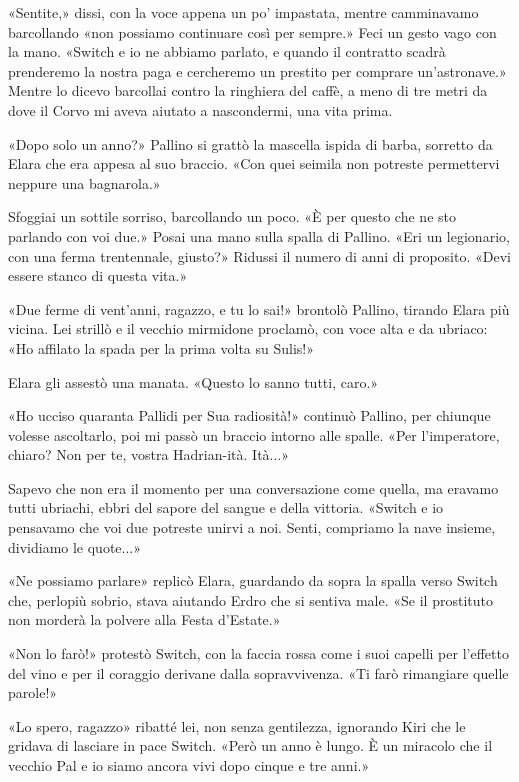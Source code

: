 «Sentite,» dissi, con la voce appena un po' impastata, mentre
camminavamo barcollando «non possiamo continuare così per sempre.» Feci
un gesto vago con la mano. «Switch e io ne abbiamo parlato, e quando il
contratto scadrà prenderemo la nostra paga e cercheremo un prestito per
comprare un'astronave.» Mentre lo dicevo barcollai contro la ringhiera
del caffè, a meno di tre metri da dove il Corvo mi aveva aiutato a
nascondermi, una vita prima.

«Dopo solo un anno?» Pallino si grattò la mascella ispida di barba,
sorretto da Elara che era appesa al suo braccio. «Con quei seimila non
potreste permettervi neppure una bagnarola.»

Sfoggiai un sottile sorriso, barcollando un poco. «È per questo che ne
sto parlando con voi due.» Posai una mano sulla spalla di Pallino. «Eri
un legionario, con una ferma trentennale, giusto?» Ridussi il numero di
anni di proposito. «Devi essere stanco di questa vita.»

«Due ferme di vent'anni, ragazzo, e tu lo sai!» brontolò Pallino,
tirando Elara più vicina. Lei strillò e il vecchio mirmidone proclamò,
con voce alta e da ubriaco: «Ho affilato la spada per la prima volta su
Sulis!»

Elara gli assestò una manata. «Questo lo sanno tutti, caro.»

«Ho ucciso quaranta Pallidi per Sua radiosità!» continuò Pallino, per
chiunque volesse ascoltarlo, poi mi passò un braccio intorno alle
spalle. «Per l'imperatore, chiaro? Non per te, vostra Hadrian-ità.
Ità...»

Sapevo che non era il momento per una conversazione come quella, ma
eravamo tutti ubriachi, ebbri del sapore del sangue e della vittoria.
«Switch e io pensavamo che voi due potreste unirvi a noi. Senti,
compriamo la nave insieme, dividiamo le quote...»

«Ne possiamo parlare» replicò Elara, guardando da sopra la spalla verso
Switch che, perlopiù sobrio, stava aiutando Erdro che si sentiva male.
«Se il prostituto non morderà la polvere alla Festa d'Estate.»

«Non lo farò!» protestò Switch, con la faccia rossa come i suoi capelli
per l'effetto del vino e per il coraggio derivane dalla sopravvivenza.
«Ti farò rimangiare quelle parole!»

«Lo spero, ragazzo» ribatté lei, non senza gentilezza, ignorando Kiri
che le gridava di lasciare in pace Switch. «Però un anno è lungo. È un
miracolo che il vecchio Pal e io siamo ancora vivi dopo cinque e tre
anni.»

